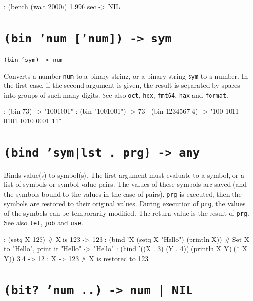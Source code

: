 \begin{wideverbatim}
: (bench (wait 2000))
1.996 sec
-> NIL
\end{wideverbatim}

 
\section*{\texttt{(bin 'num ['num]) -> sym}}
\label{sec:funct-ref-B-(bin-'num-['num])-->-sym}


\texttt{(bin 'sym) -> num}

Converts a number \texttt{num} to a binary string, or a binary string \texttt{sym} to
a number. In the first case, if the second argument is given, the result
is separated by spaces into groups of such many digits. See also \texttt{oct},
\texttt{hex}, \texttt{fmt64}, \texttt{hax} and \texttt{format}.


\begin{wideverbatim}
: (bin 73)
-> "1001001"
: (bin "1001001")
-> 73
: (bin 1234567 4)
-> "100 1011 0101 1010 0001 11"
\end{wideverbatim}

 
\section*{\texttt{(bind 'sym|lst . prg) -> any}}
\label{sec:funct-ref-B-(bind-'sym|lst-.-prg)-->-any}


Binds value(s) to symbol(s). The first argument must evaluate to a
symbol, or a list of symbols or symbol-value pairs. The values of these
symbols are saved (and the symbols bound to the values in the case of
pairs), \texttt{prg} is executed, then the symbols are restored to their
original values. During execution of \texttt{prg}, the values of the symbols
can be temporarily modified. The return value is the result of \texttt{prg}.
See also \texttt{let}, \texttt{job} and \texttt{use}.


\begin{wideverbatim}
: (setq X 123)                               # X is 123
-> 123
: (bind 'X (setq X "Hello") (println X))  # Set X to "Hello", print it
"Hello"
-> "Hello"
: (bind '((X . 3) (Y . 4)) (println X Y) (* X Y))
3 4
-> 12
: X
-> 123                                       # X is restored to 123
\end{wideverbatim}

 
\section*{\texttt{(bit? 'num ..) -> num | NIL}}
\label{sec:funct-ref-B-(bit?-'num-..)-->-num-|-nil}


